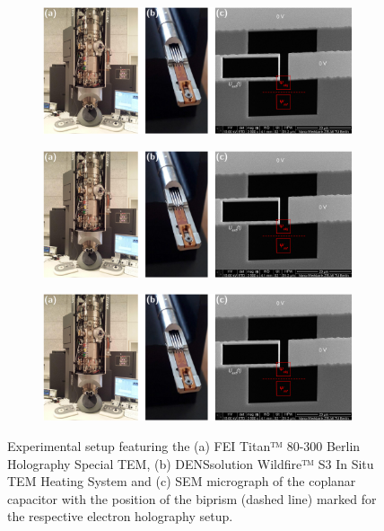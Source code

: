 \begin{figure}[H]
	\centering
	\begin{subfigure}[c]{\textwidth}
		\centering
		\includegraphics[width=\textwidth]{Figures/Setup.pdf}
		\label{fig:FEI-Titan}
	\end{subfigure}%
	\begin{subfigure}[c]{0\textwidth}
		\centering
		\includegraphics[width=\textwidth]{Figures/Setup.pdf}
		\label{fig:TEM-Holder}
	\end{subfigure}%
	\begin{subfigure}[c]{0\textwidth}
		\centering
		\includegraphics[width=\textwidth]{Figures/Setup.pdf}
		\label{fig:Capacitor-SEM}
	\end{subfigure}%
	\caption{Experimental setup featuring the (a) FEI Titan™ 80-300 Berlin Holography Special TEM, (b) DENSsolution Wildfire™ S3 In Situ TEM Heating System and (c) SEM micrograph of the coplanar capacitor with the position of the biprism (dashed line) marked for the respective electron holography setup.}
	\label{fig:Experiment-Setup}
\end{figure}
